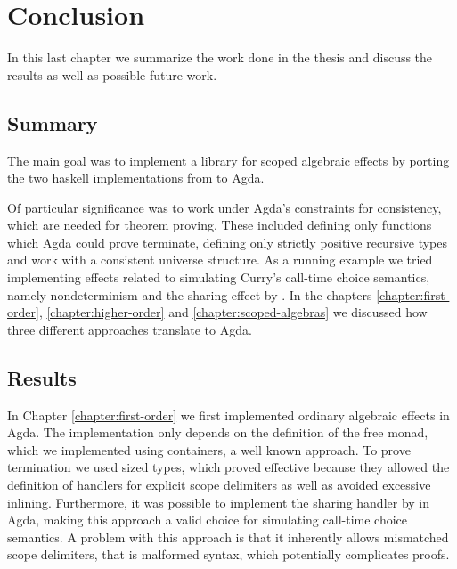 \documentclass[10pt,a4paper,twoside,notitlepage]{report}
\begin{document}
\chapter{Conclusion}
\label{chapter:conclusion}

In this last chapter we summarize the work done in the thesis and discuss the
results as well as possible future work.

\section{Summary}

The main goal was to implement a library for scoped algebraic effects by
porting the two haskell implementations from
 to Agda.

Of particular significance was to work under Agda's constraints for consistency,
which are needed for theorem proving.
These included defining only functions which Agda could prove terminate, defining
only strictly positive recursive types and work with a consistent universe
structure.
As a running example we tried implementing effects related to simulating Curry's
call-time choice semantics, namely nondeterminism and the sharing effect by
\textcite{bunkenburg2019modeling}.
In the chapters \ref{chapter:first-order}, \ref{chapter:higher-order} and
\ref{chapter:scoped-algebras} we discussed how three different approaches
translate to Agda.


\section{Results}

In Chapter \ref{chapter:first-order} we first implemented ordinary algebraic
effects in Agda.
The implementation only depends on the definition of the free monad, which
we implemented using containers, a well known approach.
To prove termination we used sized types, which proved effective because they
allowed the definition of \textcite{DBLP:conf/haskell/WuSH14} handlers for
explicit scope delimiters as well as avoided excessive inlining.
Furthermore, it was possible to implement the sharing handler by
\textcite{bunkenburg2019modeling} in Agda, making this approach a valid choice
for simulating call-time choice semantics.
A problem with this approach is that it inherently allows mismatched scope
delimiters, that is malformed syntax, which potentially complicates proofs.
\end{document}
